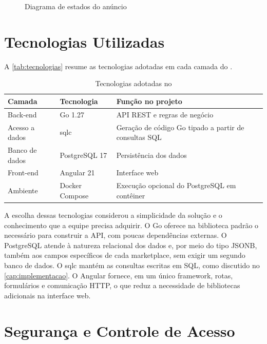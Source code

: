 \begin{figure}[htbp]
  \centering
  \caption{Diagrama de estados do anúncio}
  \label{fig:estados}
  \resizebox{\linewidth}{!}{}
\end{figure}

\section{Tecnologias Utilizadas}
A \autoref{tab:tecnologias} resume as tecnologias adotadas em cada camada do \sistema{} \cite{go,sqlc,postgresql,angular}.

\begin{table}[htbp]
  \centering
  \caption{Tecnologias adotadas no \sistema}
  \label{tab:tecnologias}
  \begin{tabularx}{\textwidth}{llX}
    \toprule
    \textbf{Camada} & \textbf{Tecnologia} & \textbf{Função no projeto} \\
    \midrule
    Back-end       & Go 1.27        & API REST e regras de negócio \\
    Acesso a dados & sqlc           & Geração de código Go tipado a partir de consultas SQL \\
    Banco de dados & PostgreSQL 17  & Persistência dos dados \\
    Front-end      & Angular 21     & Interface web \\
    Ambiente       & Docker Compose & Execução opcional do PostgreSQL em contêiner \\
    \bottomrule
  \end{tabularx}
\end{table}

A escolha dessas tecnologias considerou a simplicidade da solução e o conhecimento que a equipe precisa adquirir. O Go oferece na biblioteca padrão o necessário para construir a API, com poucas dependências externas. O PostgreSQL atende à natureza relacional dos dados e, por meio do tipo JSONB, também aos campos específicos de cada marketplace, sem exigir um segundo banco de dados. O sqlc mantém as consultas escritas em SQL, como discutido no \autoref{cap:implementacao}. O Angular fornece, em um único framework, rotas, formulários e comunicação HTTP, o que reduz a necessidade de bibliotecas adicionais na interface web.

\section{Segurança e Controle de Acesso}

